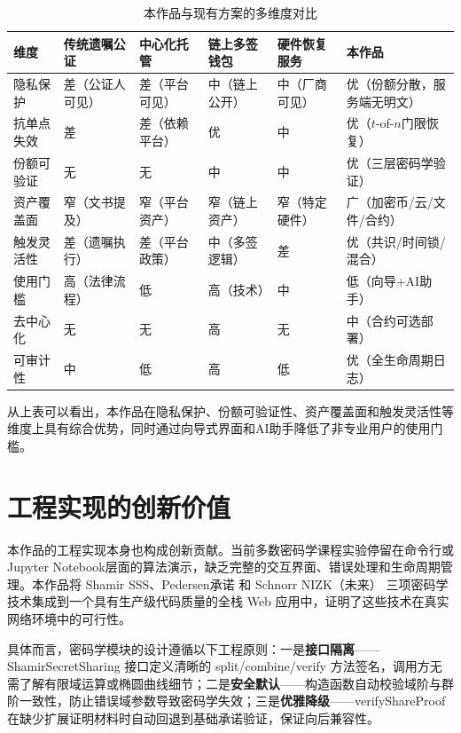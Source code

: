 \documentclass[UTF8,a4paper,zihao=-4,openany]{ctexrep}
\begin{document}
\begin{table}[htbp]
\centering
\small
\caption{本作品与现有方案的多维度对比}
\begin{tabularx}{\textwidth}{p{2cm}p{2.2cm}p{2.2cm}p{2.2cm}p{2.2cm}X}
\toprule
维度 & 传统遗嘱公证 & 中心化托管 & 链上多签钱包 & 硬件恢复服务 & 本作品\\
\midrule
隐私保护 & 差（公证人可见） & 差（平台可见） & 中（链上公开） & 中（厂商可见） & 优（份额分散，服务端无明文）\\
抗单点失效 & 差 & 差（依赖平台） & 优 & 中 & 优（$t$-of-$n$门限恢复）\\
份额可验证 & 无 & 无 & 中 & 中 & 优（三层密码学验证）\\
资产覆盖面 & 窄（文书提及） & 窄（平台资产） & 窄（链上资产） & 窄（特定硬件） & 广（加密币/云/文件/合约）\\
触发灵活性 & 差（遗嘱执行） & 差（平台政策） & 中（多签逻辑） & 差 & 优（共识/时间锁/混合）\\
使用门槛 & 高（法律流程） & 低 & 高（技术） & 中 & 低（向导+AI助手）\\
去中心化 & 无 & 无 & 高 & 无 & 中（合约可选部署）\\
可审计性 & 中 & 低 & 高 & 低 & 优（全生命周期日志）\\
\bottomrule
\end{tabularx}
\end{table}

从上表可以看出，本作品在隐私保护、份额可验证性、资产覆盖面和触发灵活性等维度上具有综合优势，同时通过向导式界面和AI助手降低了非专业用户的使用门槛。

\section{工程实现的创新价值}

本作品的工程实现本身也构成创新贡献。当前多数密码学课程实验停留在命令行或Jupyter Notebook层面的算法演示，缺乏完整的交互界面、错误处理和生命周期管理。本作品将 Shamir SSS、Pedersen承诺 和 Schnorr NIZK（未来） 三项密码学技术集成到一个具有生产级代码质量的全栈 Web 应用中，证明了这些技术在真实网络环境中的可行性。

具体而言，密码学模块的设计遵循以下工程原则：一是\textbf{接口隔离}——ShamirSecretSharing 接口定义清晰的 split/combine/verify 方法签名，调用方无需了解有限域运算或椭圆曲线细节；二是\textbf{安全默认}——构造函数自动校验域阶与群阶一致性，防止错误域参数导致密码学失效；三是\textbf{优雅降级}——verifyShareProof 在缺少扩展证明材料时自动回退到基础承诺验证，保证向后兼容性。
\end{document}
